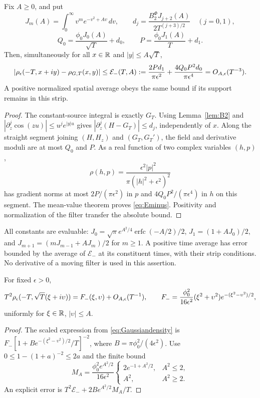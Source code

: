 \begin{theorem}\label{thm:negative}
Fix $A\ge0$, and put
\[
 J_m(A)=\int_0^\infty v^me^{-v^2+Av}\,dv,\qquad
 d_j=\frac{B_2^{\Phi}J_{j+2}(A)}{2T^{(j+3)/2}}\quad(j=0,1),
\]
\[
 Q_0=\frac{\phi_0J_0(A)}{\sqrt T}+d_0,\qquad
 P=\frac{\phi_0J_1(A)}{T}+d_1 .
\]
Then, simultaneously for all $x\in\mathbb R$ and $|y|\le A\sqrt T$,
\begin{equation}
 |\rho_\epsilon(-T,x+iy)-\rho_{G,T}(x,y)|
 \le \mathcal E_-(T,A):=
 \frac{2Pd_1}{\pi\epsilon^2}
 +\frac{4Q_0P^2d_0}{\pi\epsilon^4}
 =O_{A,\epsilon}(T^{-3}).
 \label{eq:Eminus}
\end{equation}
A positive normalized spatial average obeys the same bound if its
support remains in this strip.
\end{theorem}
\begin{proof}
The constant-source integral is exactly $G_T$.
Using Lemma~\ref{lem:B2} and
$|\partial_z^j\cos(zu)|\le u^je^{|y|u}$ gives
$|\partial_z^j(H-G_T)|\le d_j$, independently of $x$.
Along the straight segment joining $(H,H_z)$ and $(G_T,G_T')$,
the field and derivative moduli are at most $Q_0$ and $P$.
As a real function of two complex variables $(h,p)$,
\[
 \rho(h,p)=\frac{\epsilon^2|p|^2}{\pi(|h|^2+\epsilon^2)^2}
\]
has gradient norms at most $2P/(\pi\epsilon^2)$ in $p$
and $4Q_0P^2/(\pi\epsilon^4)$ in $h$ on this segment.
The mean-value theorem proves \eqref{eq:Eminus}.
Positivity and normalization of the filter transfer the absolute bound.
\end{proof}

All constants are evaluable: $J_0=\sqrt\pi e^{A^2/4}
\operatorname{erfc}(-A/2)/2$, $J_1=(1+AJ_0)/2$, and
$J_{m+1}=(mJ_{m-1}+AJ_m)/2$ for $m\ge1$.
A positive time average has error bounded by the average of
$\mathcal E_-$ at its constituent times, with their strip conditions.
No derivative of a moving filter is used in this assertion.

\begin{corollary}\label{cor:negative}
For fixed $\epsilon>0$,
\begin{equation}
 T^2\rho_\epsilon(-T,\sqrt T(\xi+i\upsilon))
 =F_-(\xi,\upsilon)+O_{A,\epsilon}(T^{-1}),\qquad
 F_-=\frac{\phi_0^2}{16\epsilon^2}
       (\xi^2+\upsilon^2)e^{-(\xi^2-\upsilon^2)/2},
 \label{eq:negativeprofile}
\end{equation}
uniformly for $\xi\in\mathbb R$, $|\upsilon|\le A$.
\end{corollary}
\begin{proof}
The scaled expression from \eqref{eq:Gaussiandensity} is
$F_-[1+B e^{-(\xi^2-\upsilon^2)/2}/T]^{-2}$, where
$B=\pi\phi_0^2/(4\epsilon^2)$.
Use $0\le1-(1+a)^{-2}\le2a$ and the finite bound
\[
 M_A=\frac{\phi_0^2e^{A^2/2}}{16\epsilon^2}
 \begin{cases}2e^{-1+A^2/2},&A^2\le2,\\ A^2,&A^2\ge2.\end{cases}
\]
An explicit error is $T^2\mathcal E_-+
2Be^{A^2/2}M_A/T$.
\end{proof}

